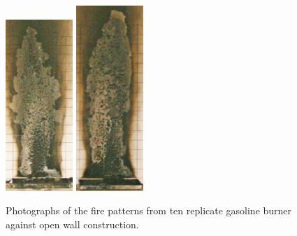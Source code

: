 \documentclass[twoside]{uocthesis}
\begin{document}
\begin{figure}[p]
	\includegraphics[width=1.0in]{../Figures/GBGAS_33_IMG_6326}
	\includegraphics[width=1.0in]{../Figures/GBGAS_34_IMG_6345} \\

	\caption[Photographs of the fire patterns from ten replicate gasoline burner against open wall construction]{Photographs of the fire patterns from ten replicate gasoline burner against open wall construction.}
	\label{Gas_Open_Wall}
\end{figure}
\end{document}
